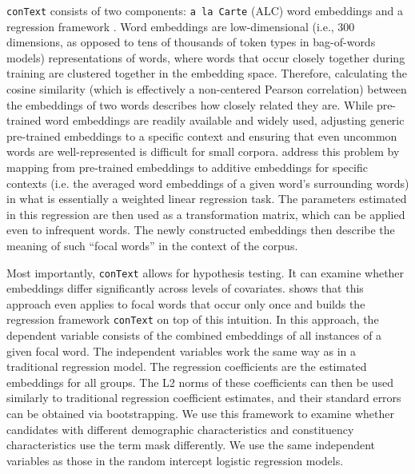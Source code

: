 {\texttt{conText} consists of two components: \texttt{a la Carte} (ALC) word embeddings \parencite{khodak2018} and a regression framework \parencite{rodriguez2021embedding}. Word embeddings \parencite{mikolov2013} are low-dimensional (i.e., 300 dimensions, as opposed to tens of thousands of token types in bag-of-words models) representations of words, where words that occur closely together during training are clustered together in the embedding space. Therefore, calculating the cosine similarity (which is effectively a non-centered Pearson correlation) between the embeddings of two words describes how closely related they are. While pre-trained word embeddings are readily available and widely used, adjusting generic pre-trained embeddings to a specific context and ensuring that even uncommon words are well-represented is difficult for small corpora. \cite{khodak2018} address this problem by mapping from pre-trained embeddings to additive embeddings for specific contexts (i.e. the averaged word embeddings of a given word's surrounding words) in what is essentially a weighted linear regression task. The parameters estimated in this regression are then used as a transformation matrix, which can be applied even to infrequent words. The newly constructed embeddings then describe the meaning of such ``focal words'' in the context of the corpus.

Most importantly, \texttt{conText} allows for hypothesis testing. It can examine whether embeddings differ significantly across levels of covariates. \cite{rodriguez2021embedding} shows that this approach even applies to focal words that occur only once and builds the regression framework \texttt{conText} on top of this intuition. In this approach, the dependent variable consists of the combined embeddings of all instances of a given focal word. The independent variables work the same way as in a traditional regression model. The regression coefficients are the estimated embeddings for all groups. The L2 norms of these coefficients can then be used similarly to traditional regression coefficient estimates, and their standard errors can be obtained via bootstrapping. We use this framework to examine whether candidates with different demographic characteristics and constituency characteristics use the term mask differently. We use the same independent variables as those in the random intercept logistic regression models. 

}
